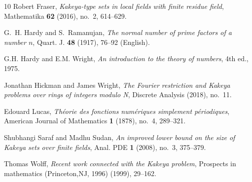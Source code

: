 \documentclass[11pt]{article}
\numberwithin{equation}{section}
\begin{document}
\begin{thebibliography}{10}
Robert Fraser, \emph{Kakeya-type sets in local fields with finite residue
  field}, Mathematika \textbf{62} (2016), no.~2, 614--629.

G.~H. {Hardy} and S.~{Ramanujan}, \emph{{The normal number of prime factors of
  a number \(n\)}}, {Quart. J.} \textbf{48} (1917), 76--92 (English).

G.H. {Hardy} and E.M. Wright, \emph{An introduction to the theory of numbers},
  4th ed., 1975.

Jonathan Hickman and James Wright, \emph{The {F}ourier restriction and {K}akeya
  problems over rings of integers modulo {N}}, Discrete Analysis (2018),
  no.~11.

Edouard Lucas, \emph{Théorie des fonctions numériques simplement
  périodiques}, American Journal of Mathematics \textbf{1} (1878), no.~4,
  289--321.

Shubhangi Saraf and Madhu Sudan, \emph{An improved lower bound on the size of
  {K}akeya sets over finite fields}, Anal. PDE \textbf{1} (2008), no.~3,
  375--379.

Thomas Wolff, \emph{Recent work connected with the {K}akeya problem}, Prospects
  in mathematics (Princeton,NJ, 1996) (1999), 29--162.

\end{thebibliography}
\end{document}
